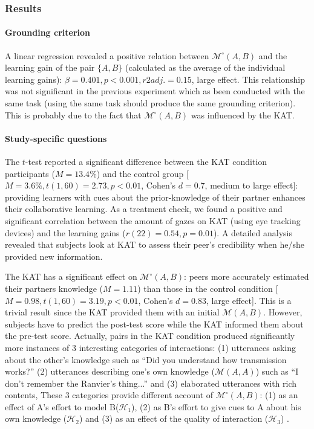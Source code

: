\documentclass[natbib]{svjour3}
\newcommand{\A}{A\xspace}
\newcommand{\B}{B\xspace}
\newcommand{\gmodel}[2]{{$\mathcal{M}(#1, #2)$}}
\newcommand{\gModel}[2]{{$\mathcal{M}^{\circ}(#1, #2)$}}
\begin{document}
\subsubsection*{Results}

\paragraph{Grounding criterion} A linear regression revealed a positive relation
between \gModel{A}{B} and the learning gain of the pair $\{A, B\}$ (calculated
as the average of the individual learning gains): $\beta= 0.401, p < 0.001, r2adj.
= 0.15$, large effect. This relationship was not significant in the previous
experiment which as been conducted with the same task (using the same task
should produce the same grounding criterion). This is probably due to the fact that
\gModel{A}{B} was influenced by the KAT.

\paragraph{Study-specific questions} The $t$-test reported a significant
difference between the KAT condition participants ($M = 13.4\%$) and the control
group [$M = 3.6\%, t(1, 60) = 2.73, p < 0.01$, Cohen's $d = 0.7$, medium to large
effect]: providing learners with cues about the prior-knowledge of their partner
enhances their collaborative learning. As a treatment check, we found a positive
and significant correlation between the amount of gazes on KAT (using eye
tracking devices) and the learning gains ($r(22) = 0.54, p = 0.01$). A detailed
analysis revealed that subjects look at KAT to assess their peer's credibility
when he/she provided new information. 

The KAT has a significant effect on \gModel{A}{B}: peers more accurately
estimated their partners knowledge ($M = 1.11$) than those in the control
condition [$M = 0.98, t(1, 60) = 3.19, p < 0.01$, Cohen's $d = 0.83$, large
effect]. This is a trivial result since the KAT provided them with an initial
\gmodel{A}{B}. However, subjects have to predict the post-test score while the
KAT informed them about the pre-test score. Actually, pairs in the KAT condition
produced significantly more instances of 3 interesting categories of
interactions: (1) utterances asking about the other's knowledge such as ``Did
you understand how transmission works?'' (2) utterances describing one's own
knowledge (\gmodel{A}{A}) such as ``I don't remember the Ranvier's thing...''
and (3) elaborated utterances with rich contents,  These 3 categories provide
different account of \gModel{A}{B}: (1) as an effect of \A's effort to model
\B  ($\mathcal{H}_{1}$), (2) as \B's effort to give cues to \A about his own
knowledge  ($\mathcal{H}_{2}$) and (3) as an effect of the quality of
interaction  ($\mathcal{H}_{3}$) .
\end{document}
